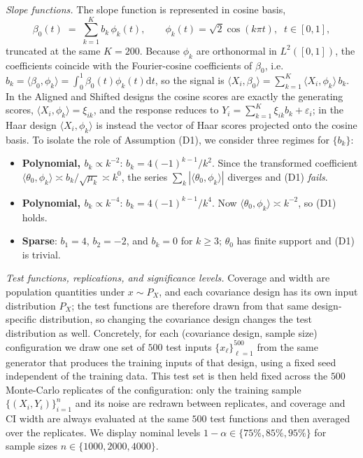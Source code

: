 \documentclass[aos]{imsart}
\newcommand{\ud}{\mathrm d}
\theoremstyle{plain}
\theoremstyle{definition}
\theoremstyle{definition}
\begin{document}
\medskip\noindent\textit{Slope functions.}
The slope function is represented in cosine basis,
\[
\beta_0(t)\;=\;\sum_{k=1}^{K} b_k\,\phi_k(t),\qquad \phi_k(t)=\sqrt 2\cos(k\pi t),\;\; t\in[0,1],
\]
truncated at the same $K=200$. Because $\phi_k$ are orthonormal in $L^2([0,1])$, the coefficients coincide with the Fourier-cosine coefficients of $\beta_0$, i.e.\ $b_k=\langle\beta_0,\phi_k\rangle=\int_0^1\beta_0(t)\phi_k(t)\ud t$, so the signal is $\langle X_i,\beta_0\rangle=\sum_{k=1}^{K}\langle X_i,\phi_k\rangle\,b_k$. In the Aligned and Shifted designs the cosine scores are exactly the generating scores, $\langle X_i,\phi_k\rangle=\xi_{ik}$, and the response reduces to $Y_i=\sum_{k=1}^{K}\xi_{ik}b_k+\varepsilon_i$; in the Haar design $\langle X_i,\phi_k\rangle$ is instead the vector of Haar scores projected onto the cosine basis. To isolate the role of Assumption (D1), we consider three regimes for $\{b_k\}$:
\begin{itemize}
\item \textbf{Polynomial, $b_k\propto k^{-2}$}: $b_k=4(-1)^{k-1}/k^{2}$. Since the transformed coefficient $\langle\theta_0,\phi_k\rangle\asymp b_k/\sqrt{\mu_k}\asymp k^{0}$, the series $\sum_k|\langle\theta_0,\phi_k\rangle|$ diverges and (D1) \emph{fails}.
\item \textbf{Polynomial, $b_k\propto k^{-4}$}: $b_k=4(-1)^{k-1}/k^{4}$. Now $\langle\theta_0,\phi_k\rangle\asymp k^{-2}$, so (D1) holds.
\item \textbf{Sparse}: $b_1=4$, $b_2=-2$, and $b_k=0$ for $k\geq 3$; $\theta_0$ has finite support and (D1) is trivial.
\end{itemize}

\medskip\noindent\textit{Test functions, replications, and significance levels.}
Coverage and width are population quantities under $x\sim P_X$, and each covariance design has its own input distribution $P_X$; the test functions are therefore drawn from that same design-specific distribution, so changing the covariance design changes the test distribution as well.  Concretely, for each (covariance design, sample size) configuration we draw one set of $500$ test inputs $\{x_\ell\}_{\ell=1}^{500}$ from the same generator that produces the training inputs of that design, using a fixed seed independent of the training data. This test set is then held fixed across the $500$ Monte-Carlo replicates of the configuration: only the training sample $\{(X_i,Y_i)\}_{i=1}^n$ and its noise are redrawn between replicates, and coverage and CI width are always evaluated at the same $500$ test functions and then averaged over the replicates. We display nominal levels $1-\alpha\in\{75\%,85\%,95\%\}$ for sample sizes $n\in\{1000,2000,4000\}$.
\end{document}

